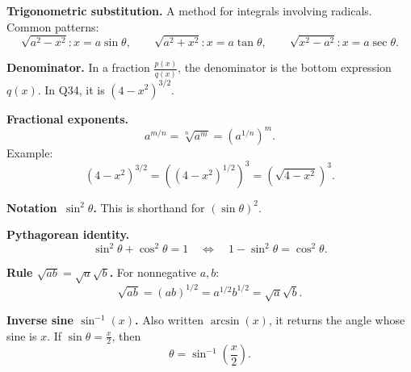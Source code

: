 \documentclass{article}
\newcommand{\defanchor}[1]{\hypertarget{def:#1}{}}
\begin{document}
    \defanchor{trig-sub}\textbf{Trigonometric substitution.}
    A method for integrals involving radicals. Common patterns:
    \[
    \sqrt{a^2-x^2}: x=a\sin\theta,\qquad
    \sqrt{a^2+x^2}: x=a\tan\theta,\qquad
    \sqrt{x^2-a^2}: x=a\sec\theta.
    \]

    \defanchor{denominator}\textbf{Denominator.}
    In a fraction $\frac{p(x)}{q(x)}$, the denominator is the bottom expression $q(x)$.
    In Q34, it is $(4-x^2)^{3/2}$.

    \defanchor{frac-exp}\textbf{Fractional exponents.}
    \[
    a^{m/n}=\sqrt[n]{a^m}=\left(a^{1/n}\right)^m.
    \]
    Example:
    \[
    (4-x^2)^{3/2}=\left((4-x^2)^{1/2}\right)^3=\left(\sqrt{4-x^2}\right)^3.
    \]

    \defanchor{notation}\textbf{Notation $\,\sin^2\theta$.}
    This is shorthand for $(\sin\theta)^2$.

    \defanchor{pyth-id}\textbf{Pythagorean identity.}
    \[
    \sin^2\theta+\cos^2\theta=1
    \quad\Longleftrightarrow\quad
    1-\sin^2\theta=\cos^2\theta.
    \]

    \defanchor{sqrt-rule}\textbf{Rule $\sqrt{ab}=\sqrt a\sqrt b$.}
    For nonnegative $a,b$:
    \[
    \sqrt{ab}=(ab)^{1/2}=a^{1/2}b^{1/2}=\sqrt a\sqrt b.
    \]

    \defanchor{inv-sine}\textbf{Inverse sine $\sin^{-1}(x)$.}
    Also written $\arcsin(x)$, it returns the angle whose sine is $x$.
    If $\sin\theta=\frac{x}{2}$, then
    \[
    \theta=\sin^{-1}\!\left(\frac{x}{2}\right).
    \]
\end{document}
